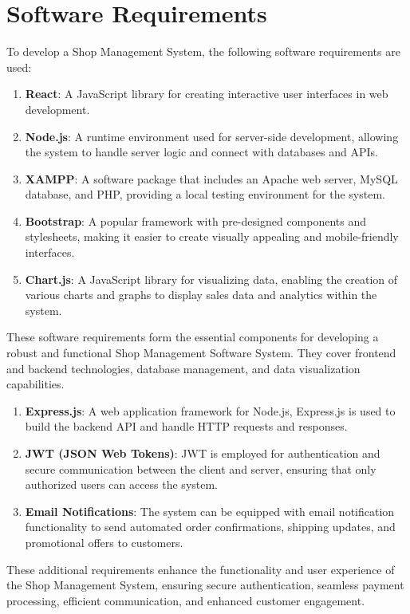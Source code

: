 \section{Software Requirements}
To develop a Shop Management System, the following software requirements are used:

\begin{enumerate}
\item \textbf{React}: A JavaScript library for creating interactive user interfaces in web development.
\item \textbf{Node.js}: A runtime environment used for server-side development, allowing the system to handle server logic and connect with databases and APIs.
\item \textbf{XAMPP}: A software package that includes an Apache web server, MySQL database, and PHP, providing a local testing environment for the system.
\item \textbf{Bootstrap}: A popular framework with pre-designed components and stylesheets, making it easier to create visually appealing and mobile-friendly interfaces.
\item \textbf{Chart.js}: A JavaScript library for visualizing data, enabling the creation of various charts and graphs to display sales data and analytics within the system.
\end{enumerate}
These software requirements form the essential components for developing a robust and functional Shop Management Software System. They cover frontend and backend technologies, database management, and data visualization capabilities.\\
\begin{enumerate}
\item \textbf{Express.js}: A web application framework for Node.js, Express.js is used to build the backend API and handle HTTP requests and responses.
\item \textbf{JWT (JSON Web Tokens)}: JWT is employed for authentication and secure communication between the client and server, ensuring that only authorized users can access the system.

\item \textbf{Email Notifications}: The system can be equipped with email notification functionality to send automated order confirmations, shipping updates, and promotional offers to customers.
\end{enumerate}

These additional requirements enhance the functionality and user experience of the Shop Management System, ensuring secure authentication, seamless payment processing, efficient communication, and enhanced customer engagement.\\
